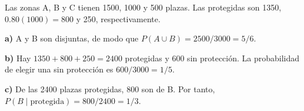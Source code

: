 Las zonas A, B y C tienen 1500, 1000 y 500 plazas. Las
protegidas son 1350, $0.80(1000)=800$ y 250, respectivamente.

\textbf{a)} A y B son disjuntas, de modo que
$P(A\cup B)=2500/3000=\boxed{5/6}$.

\textbf{b)} Hay $1350+800+250=2400$ protegidas y 600 sin
protección. La probabilidad de elegir una sin protección es
$\boxed{600/3000=1/5}$.

\textbf{c)} De las 2400 plazas protegidas, 800 son de B.
Por tanto, $P(B\mid\text{protegida})=\boxed{800/2400=1/3}$.
